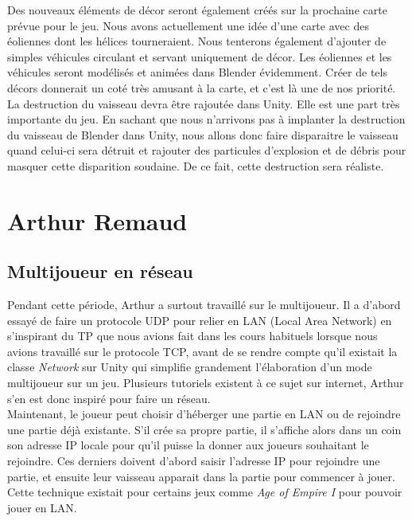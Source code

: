 \documentclass[10pt, titlepage]{report}
\begin{document}
Des nouveaux éléments de décor seront également créés sur la prochaine carte prévue pour le jeu. Nous avons actuellement une idée d’une carte avec des éoliennes dont les hélices tourneraient. Nous tenterons également d’ajouter de simples véhicules circulant et servant uniquement de décor. Les éoliennes et les véhicules seront modélisés et animées dans Blender évidemment. Créer de tels décors donnerait un coté très amusant à la carte, et c’est là une de nos priorité. \\

La destruction du vaisseau devra être rajoutée dans Unity. Elle est une part très importante du jeu. En sachant que nous n'arrivons pas à implanter la destruction du vaisseau de Blender dans Unity, nous allons donc faire disparaitre le vaisseau quand celui-ci sera détruit et rajouter des particules d'explosion et de débris pour masquer cette disparition soudaine. De ce fait, cette destruction sera réaliste.\\


\section{Arthur Remaud}

\subsection{Multijoueur en réseau}
Pendant cette période, Arthur a surtout travaillé sur le multijoueur. Il a d'abord essayé de faire un protocole UDP pour relier en LAN (Local Area Network) en s'inspirant du TP que nous avions fait dans les cours habituels lorsque nous avions travaillé sur le protocole TCP, avant de se rendre compte qu'il existait la classe \textit{Network} sur Unity qui simplifie grandement l'élaboration d'un mode multijoueur sur un jeu. Plusieurs tutoriels existent à ce sujet sur internet, Arthur s'en est donc inspiré pour faire un réseau.\\

Maintenant, le joueur peut choisir d'héberger une partie en LAN ou de rejoindre une partie déjà existante. S'il crée sa propre partie, il s'affiche alors dans un coin son adresse IP locale pour qu'il puisse la donner aux joueurs souhaitant le rejoindre. Ces derniers doivent d'abord saisir l'adresse IP pour rejoindre une partie, et ensuite leur vaisseau apparait dans la partie pour commencer à jouer. Cette technique existait pour certains jeux comme \textit{Age of Empire I} pour pouvoir jouer en LAN.\\
\end{document}
